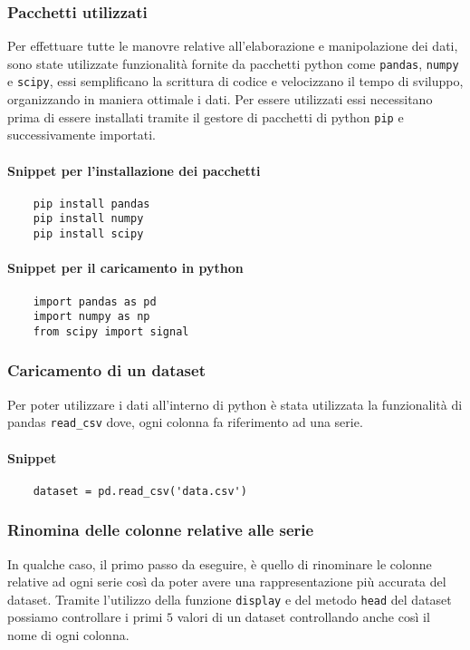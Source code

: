 \subsubsection{Pacchetti utilizzati}
Per effettuare tutte le manovre relative all'elaborazione e manipolazione dei dati, sono state
utilizzate funzionalità fornite da pacchetti python come \texttt{pandas}, \texttt{numpy} e \texttt{scipy}, essi semplificano
la scrittura di codice e velocizzano il tempo di sviluppo, organizzando in maniera ottimale
i dati. Per essere utilizzati essi necessitano prima di essere installati tramite il
gestore di pacchetti di python \texttt{pip} e successivamente importati.
\paragraph{Snippet per l'installazione dei pacchetti}
\begin{verbatim}
    pip install pandas
    pip install numpy
    pip install scipy
\end{verbatim}
\paragraph{Snippet per il caricamento in python}
\begin{verbatim}
    import pandas as pd
    import numpy as np
    from scipy import signal
\end{verbatim}



\subsubsection{Caricamento di un dataset}
Per poter utilizzare i dati all'interno di python è stata utilizzata
la funzionalità di pandas \texttt{read\_csv} dove, ogni colonna fa riferimento 
ad una serie.
\paragraph{Snippet}
\begin{verbatim}
    dataset = pd.read_csv('data.csv')
\end{verbatim}





\subsubsection{Rinomina delle colonne relative alle serie}
In qualche caso, il primo passo da eseguire, è quello di rinominare
le colonne relative ad ogni serie così da poter avere una rappresentazione
più accurata del dataset.
Tramite l'utilizzo della funzione \texttt{display} e del metodo \texttt{head}
del dataset possiamo controllare i primi $5$ valori di un dataset
controllando anche così il nome di ogni colonna.
